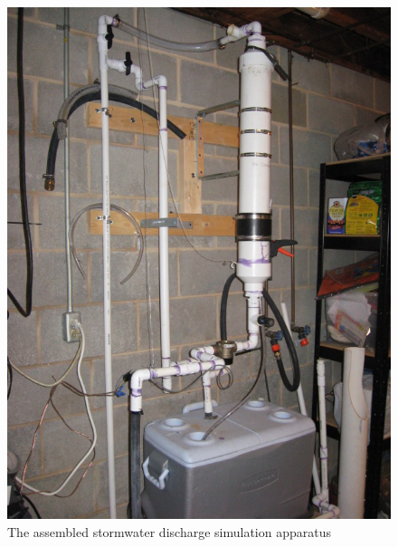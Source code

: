 \begin{center}
\begin{figure}
 \label{dischargerPhoto}
 \centering\includegraphics[scale=1.25]{dischargerPhoto.jpg}
 \caption{The assembled stormwater discharge simulation apparatus}
\end{figure}
\end{center}

